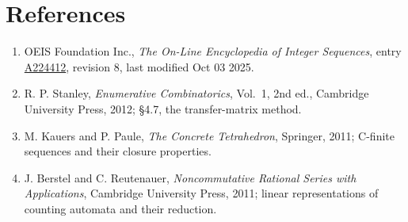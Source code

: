 \documentclass[11pt]{article}
\theoremstyle{definition}
\begin{document}
\section{References}

\begin{enumerate}

\item OEIS Foundation Inc., \emph{The On-Line Encyclopedia of Integer Sequences}, entry \href{https://oeis.org/A224412}{A224412}, revision 8, last modified Oct 03 2025.

\item R. P. Stanley, \emph{Enumerative Combinatorics}, Vol.~1, 2nd ed., Cambridge University Press, 2012; \S4.7, the transfer-matrix method.

\item M. Kauers and P. Paule, \emph{The Concrete Tetrahedron}, Springer, 2011; C-finite sequences and their closure properties.

\item J. Berstel and C. Reutenauer, \emph{Noncommutative Rational Series with Applications}, Cambridge University Press, 2011; linear representations of counting automata and their reduction.

\end{enumerate}
\end{document}
